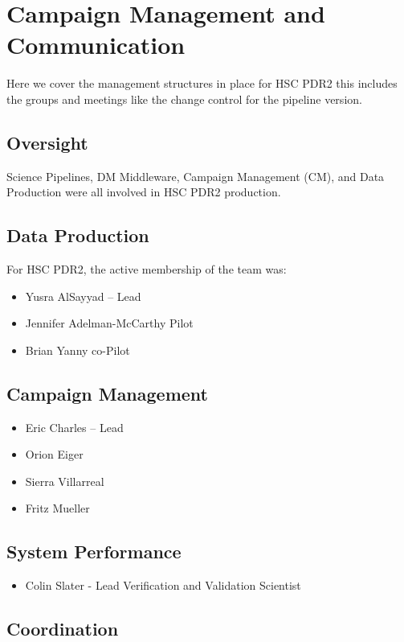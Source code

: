 \section{Campaign Management and Communication} \label{sec:management}

Here we cover the management structures in place for HSC PDR2 
this includes the groups and meetings like the change control for 
the pipeline version.

\subsection{Oversight}

Science Pipelines, DM Middleware, Campaign Management (CM), and Data Production
were all involved in HSC PDR2 production.

\subsection{Data Production}

For HSC PDR2, the active membership of the team was:
\begin{itemize}
\item Yusra AlSayyad -- Lead
\item Jennifer Adelman-McCarthy Pilot
\item Brian Yanny co-Pilot
\end{itemize}


\subsection{Campaign Management}
\begin{itemize}
\item Eric Charles -- Lead
\item Orion Eiger
\item Sierra Villarreal
\item Fritz Mueller
\end{itemize}

\subsection{System Performance}
\begin{itemize}
\item Colin Slater - Lead Verification and Validation Scientist
\end{itemize}

\subsection{Coordination}


